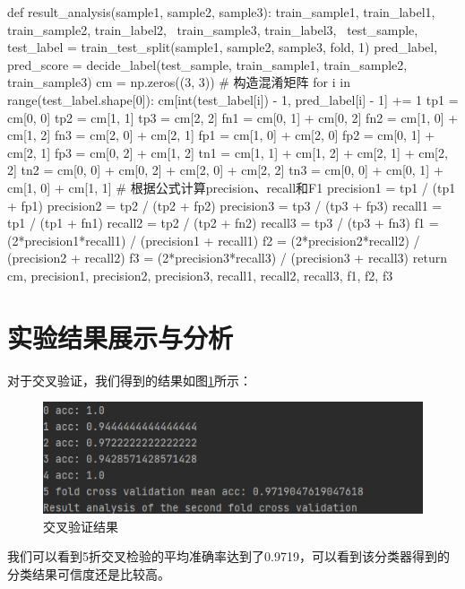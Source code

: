 \documentclass[UTF8,a4paper,10pt]{ctexart}
\begin{document}
\begin{python}
    def result_analysis(sample1, sample2, sample3):
    train_sample1, train_label1, train_sample2, train_label2, \
    train_sample3, train_label3, \
    test_sample, test_label = train_test_split(sample1, sample2, sample3, fold, 1)
    pred_label, pred_score = decide_label(test_sample, train_sample1, train_sample2, train_sample3)
    cm = np.zeros((3, 3))
    # 构造混淆矩阵
    for i in range(test_label.shape[0]):
        cm[int(test_label[i]) - 1, pred_label[i] - 1] += 1
    tp1 = cm[0, 0]
    tp2 = cm[1, 1]
    tp3 = cm[2, 2]
    fn1 = cm[0, 1] + cm[0, 2]
    fn2 = cm[1, 0] + cm[1, 2]
    fn3 = cm[2, 0] + cm[2, 1]
    fp1 = cm[1, 0] + cm[2, 0]
    fp2 = cm[0, 1] + cm[2, 1]
    fp3 = cm[0, 2] + cm[1, 2]
    tn1 = cm[1, 1] + cm[1, 2] + cm[2, 1] + cm[2, 2]
    tn2 = cm[0, 0] + cm[0, 2] + cm[2, 0] + cm[2, 2]
    tn3 = cm[0, 0] + cm[0, 1] + cm[1, 0] + cm[1, 1]
    # 根据公式计算precision、recall和F1
    precision1 = tp1 / (tp1 + fp1)
    precision2 = tp2 / (tp2 + fp2)
    precision3 = tp3 / (tp3 + fp3)
    recall1 = tp1 / (tp1 + fn1)
    recall2 = tp2 / (tp2 + fn2)
    recall3 = tp3 / (tp3 + fn3)
    f1 = (2*precision1*recall1) / (precision1 + recall1)
    f2 = (2*precision2*recall2) / (precision2 + recall2)
    f3 = (2*precision3*recall3) / (precision3 + recall3)
    return cm, precision1, precision2, precision3, recall1, recall2, recall3, f1, f2, f3
\end{python}
\section{实验结果展示与分析}

对于交叉验证，我们得到的结果如图\ref{fig:1}所示：

\begin{figure}[H]
    \centering
    \includegraphics[scale=1]{1.png}
    \caption{交叉验证结果}
    \label{fig:1}
\end{figure}

我们可以看到5折交叉检验的平均准确率达到了0.9719，可以看到该分类器得到的分类结果可信度还是比较高。
\end{document}
